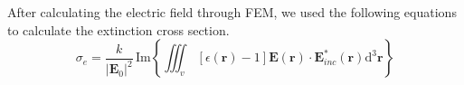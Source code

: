 \documentclass{article}
\begin{document}
    After calculating the electric field through FEM, we used the following equations to calculate the extinction cross section. \cite{mcmahonGoldNanoparticleDimer2009,yangFinitedifferenceTimeDomain1996}
    \begin{equation}
        \sigma_e = \frac{k}{|\textbf{E}_0|^2}\, \text{Im}\left\{\iiint_v  \, [\epsilon(\textbf{r}) - 1] \textbf{E}(\textbf{r}) \cdot \textbf{E}_{inc}^*(\textbf{r}) \mathrm{d}^3\textbf{r}  \right\}
    \end{equation}

    


\end{document}
